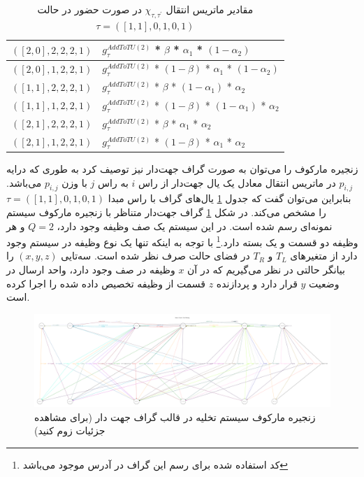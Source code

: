 \begin{table}[H]
\begin{latin}
\begin{tabular}{|l|l|}
$([2,0], 2, 2, 2, 1 )$ & $g_{\tau}^{A d d T o T U ( 2 )}$ * $\beta$ * $\alpha_1$ * $(1 - \alpha_2)$        \\ \hline
$([2,0], 1, 2, 2, 1 )$ & $g_{\tau}^{A d d T o T U ( 2 )}$ * $(1 - \beta)$ * $\alpha_1$ * $(1 - \alpha_2)$  \\ \hline
$([1,1], 2, 2, 2, 1 )$ & $g_{\tau}^{A d d T o T U ( 2 )}$ * $\beta$ * $(1 - \alpha_1)$ * $\alpha_2$        \\ \hline
$([1,1], 1, 2, 2, 1 )$ & $g_{\tau}^{A d d T o T U ( 2 )}$ * $(1 - \beta)$ * $(1 - \alpha_1)$ * $\alpha_2$  \\ \hline
$([2,1], 2, 2, 2, 1 )$ & $g_{\tau}^{A d d T o T U ( 2 )}$ * $\beta$ * $\alpha_1$ * $\alpha_2$              \\ \hline
$([2,1], 1, 2, 2, 1 )$ & $g_{\tau}^{A d d T o T U ( 2 )}$ * $(1 - \beta)$ * $\alpha_1$ * $\alpha_2$        \\ \hline



\end{tabular}
	\end{latin}
\caption{مقادیر ماتریس انتقال $\chi_{\tau, \tau^{\prime}}$ در صورت حضور در حالت $\tau = ( [1, 1], 0, 1, 0, 1 )$}
	\label{table:transitions}
\end{table}
زنجیره مارکوف را می‌توان به صورت گراف جهت‌دار نیز توصیف کرد به طوری که درایه $p_{i, j}$ در ماتریس انتقال معادل یک یال جهت‌دار از راس $i$ به راس $j$ با وزن $p_{i, j}$ می‌باشد. بنابراین می‌توان گفت که جدول \ref{table:transitions} یال‌های گراف با راس مبدا $\tau = ( [1, 1], 0, 1, 0, 1 )$ را مشخص می‌کند. در شکل \ref{fig:digraph} گراف جهت‌دار متناظر با زنجیره مارکوف سیستم نمونه‌ای رسم شده است. در این سیستم یک صف وظیفه وجود دارد، \(Q = 2\) و هر وظیفه دو قسمت و یک بسته دارد.\footnote{کد استفاده شده برای رسم این گراف در آدرس  موجود می‌باشد} با توجه به اینکه تنها یک نوع وظیفه در سیستم وجود دارد از متغیرهای $T_L$ و $T_R$ در فضای حالت صرف نظر شده است. سه‌تایی $(x, y, z)$ را بیانگر حالتی در نظر می‌گیریم که در آن $x$ وظیفه در صف وجود دارد، واحد ارسال در وضعیت $y$ قرار دارد و پردازنده $z$ قسمت از وظیفه تخصیص داده شده را اجرا کرده است.

\newpage
\begin{landscape}
	\begin{figure}
		\centering
		\includegraphics[width=1.5\textwidth]{figures/graph.pdf}
		\caption[زنجیره مارکوف سیستم تخلیه در قالب گراف جهت دار]{
			زنجیره مارکوف سیستم تخلیه در قالب گراف جهت دار (برای مشاهده جزئیات زوم کنید)
		}
		\label{fig:digraph}
	\end{figure}
\end{landscape}
\newpage
